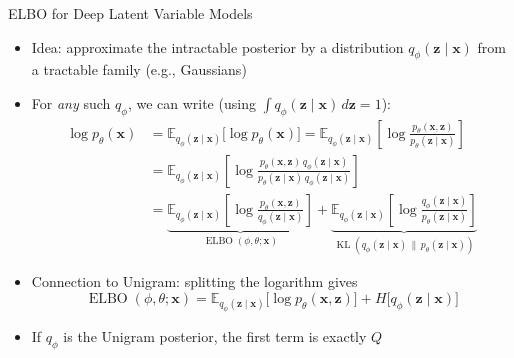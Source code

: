 \documentclass[11pt,compress,t,notes=noshow, xcolor=table]{beamer}
\providecommand{\bx}{\mathbf{x}}
\providecommand{\bz}{\mathbf{z}}
\begin{document}
\begin{frame}{ELBO for Deep Latent Variable Models}

\vfill

\begin{itemize}
\item Idea: approximate the intractable posterior by a distribution $q_\phi(\bz \mid \bx)$ from a tractable family (e.g., Gaussians)
\item For \emph{any} such $q_\phi$, we can write (using $\int q_\phi(\bz \mid \bx)\, d\bz = 1$):
\begin{align*}
\log p_\theta(\bx) &= \mathbb{E}_{q_\phi(\bz \mid \bx)}\big[\log p_\theta(\bx)\big]
= \mathbb{E}_{q_\phi(\bz \mid \bx)}\left[\log \frac{p_\theta(\bx, \bz)}{p_\theta(\bz \mid \bx)}\right]\\
&= \mathbb{E}_{q_\phi(\bz \mid \bx)}\left[\log \frac{p_\theta(\bx, \bz)\, q_\phi(\bz \mid \bx)}{p_\theta(\bz \mid \bx)\, q_\phi(\bz \mid \bx)}\right]\\
&= \underbrace{\mathbb{E}_{q_\phi(\bz \mid \bx)}\left[\log \frac{p_\theta(\bx, \bz)}{q_\phi(\bz \mid \bx)}\right]}_{\operatorname{ELBO}(\phi, \theta; \bx)} + \underbrace{\mathbb{E}_{q_\phi(\bz \mid \bx)}\left[\log \frac{q_\phi(\bz \mid \bx)}{p_\theta(\bz \mid \bx)}\right]}_{\operatorname{KL}(q_\phi(\bz \mid \bx) \,\|\, p_\theta(\bz \mid \bx))}
\end{align*}
\item<2-> Connection to Unigram: splitting the logarithm gives
\begin{equation*}
\operatorname{ELBO}(\phi, \theta; \bx) = \mathbb{E}_{q_\phi(\bz \mid \bx)}\big[\log p_\theta(\bx, \bz)\big] + H\big[q_\phi(\bz \mid \bx)\big]
\end{equation*}
\item<2-> If $q_\phi$ is the Unigram posterior, the first term is exactly $Q$
\end{itemize}

\vfill

\end{frame}
\end{document}
